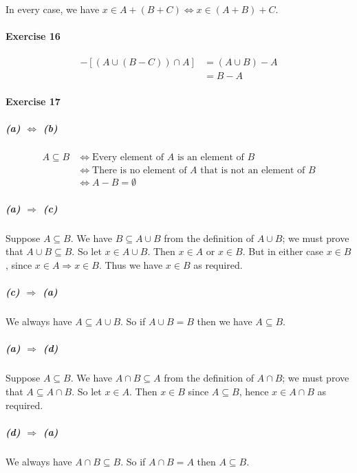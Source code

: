 \documentclass{report}
\begin{document}
    In every case, we have $x \in A + (B + C) \Leftrightarrow x \in (A + B) + C$.

    \paragraph{Exercise 16}

    \begin{align*}
        [(A \cup B \cup C) \cap (A \cup B)] - [(A \cup (B - C)) \cap A]
        & = (A \cup B) - A \\
        & = B - A
    \end{align*}

    \paragraph{Exercise 17}
    \subparagraph{(a) $\Leftrightarrow$ (b)}
    \begin{align*}
        A \subseteq B & \Leftrightarrow \text{Every element of $A$ is an element of $B$} \\
        & \Leftrightarrow \text{There is no element of $A$ that is not an element of $B$} \\
        & \Leftrightarrow A - B = \emptyset
    \end{align*}

    \subparagraph{(a) $\Rightarrow$ (c)}
    Suppose $A \subseteq B$. We have $B \subseteq A \cup B$ from the definition of $A \cup B$;
    we must prove that $A \cup B \subseteq B$. So let $x \in A \cup B$. Then $x \in A$ or $x \in B$.
    But in either case $x \in B$, since $x \in A \Rightarrow x \in B$. Thus we have $x \in B$ as required.

    \subparagraph{(c) $\Rightarrow$ (a)}
    We always have $A \subseteq A \cup B$. So if $A \cup B = B$ then we have $A \subseteq B$.

    \subparagraph{(a) $\Rightarrow$ (d)}
    Suppose $A \subseteq B$. We have $A \cap B \subseteq A$ from the definition of $A \cap B$;
    we must prove that $A \subseteq A \cap B$. So let $x \in A$. Then $x \in B$ since $A \subseteq B$,
    hence $x \in A \cap B$ as required.

    \subparagraph{(d) $\Rightarrow$ (a)}
    We always have $A \cap B \subseteq B$. So if $A \cap B = A$ then $A \subseteq B$.
\end{document}
